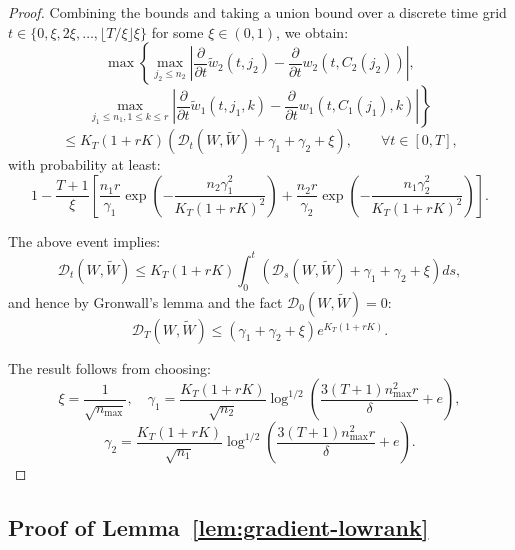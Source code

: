 \begin{proof}
Combining the bounds and taking a union bound over a discrete time grid $t \in \{0, \xi, 2\xi, \ldots, \lfloor T/\xi\rfloor\xi\}$ for some $\xi \in (0,1)$, we obtain:
\[
\max\left\{\max_{j_2 \le n_2}\left|\frac{\partial}{\partial t}\tilde{w}_2(t, j_2) - \frac{\partial}{\partial t}w_2(t, C_2(j_2))\right|,\right.
\]
\[
\left.\max_{j_1 \le n_1, 1 \le k \le r}\left|\frac{\partial}{\partial t}\tilde{w}_1(t, j_1, k) - \frac{\partial}{\partial t}w_1(t, C_1(j_1), k)\right|\right\}
\]
\[
\le K_T(1+rK)(\mathscr{D}_t(W, \tilde{W}) + \gamma_1 + \gamma_2 + \xi), \qquad \forall t \in [0, T],
\]
with probability at least:
\[
1 - \frac{T+1}{\xi}\left[\frac{n_1r}{\gamma_1}\exp\left(-\frac{n_2\gamma_1^2}{K_T(1+rK)^2}\right) + \frac{n_2r}{\gamma_2}\exp\left(-\frac{n_1\gamma_2^2}{K_T(1+rK)^2}\right)\right].
\]

The above event implies:
\[
\mathscr{D}_t(W, \tilde{W}) \le K_T(1+rK)\int_0^t(\mathscr{D}_s(W, \tilde{W}) + \gamma_1 + \gamma_2 + \xi)ds,
\]
and hence by Gronwall's lemma and the fact $\mathscr{D}_0(W, \tilde{W}) = 0$:
\[
\mathscr{D}_T(W, \tilde{W}) \le (\gamma_1 + \gamma_2 + \xi)e^{K_T(1+rK)}.
\]

The result follows from choosing:
\[
\xi = \frac{1}{\sqrt{n_{\max}}}, \quad \gamma_1 = \frac{K_T(1+rK)}{\sqrt{n_2}}\log^{1/2}\left(\frac{3(T+1)n_{\max}^2r}{\delta} + e\right),
\]
\[
\gamma_2 = \frac{K_T(1+rK)}{\sqrt{n_1}}\log^{1/2}\left(\frac{3(T+1)n_{\max}^2r}{\delta} + e\right).
\]
\end{proof}

\subsection{Proof of Lemma~\ref{lem:gradient-lowrank}}

